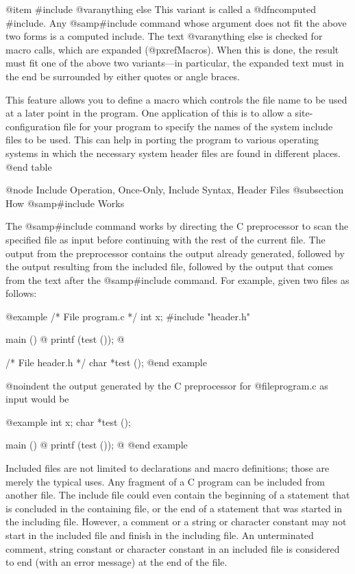 {@item #include @var{anything else}
This variant is called a @dfn{computed #include}.  Any @samp{#include}
command whose argument does not fit the above two forms is a computed
include.  The text @var{anything else} is checked for macro calls,
which are expanded (@pxref{Macros}).  When this is done, the result
must fit one of the above two variants---in particular, the expanded
text must in the end be surrounded by either quotes or angle braces.

This feature allows you to define a macro which controls the file name
to be used at a later point in the program.  One application of this
is to allow a site-configuration file for your program to specify the
names of the system include files to be used.  This can help in
porting the program to various operating systems in which the
necessary system header files are found in different places.
@end table

@node Include Operation, Once-Only, Include Syntax, Header Files
@subsection How @samp{#include} Works

The @samp{#include} command works by directing the C preprocessor to scan
the specified file as input before continuing with the rest of the current
file.  The output from the preprocessor contains the output already
generated, followed by the output resulting from the included file,
followed by the output that comes from the text after the @samp{#include}
command.  For example, given two files as follows:

@example
/* File program.c */
int x;
#include "header.h"

main ()
@{
  printf (test ());
@}


/* File header.h */
char *test ();
@end example

@noindent
the output generated by the C preprocessor for @file{program.c} as input
would be

@example
int x;
char *test ();

main ()
@{
  printf (test ());
@}
@end example

Included files are not limited to declarations and macro definitions; those
are merely the typical uses.  Any fragment of a C program can be included
from another file.  The include file could even contain the beginning of a
statement that is concluded in the containing file, or the end of a
statement that was started in the including file.  However, a comment or a
string or character constant may not start in the included file and finish
in the including file.  An unterminated comment, string constant or
character constant in an included file is considered to end (with an error
message) at the end of the file.

}
